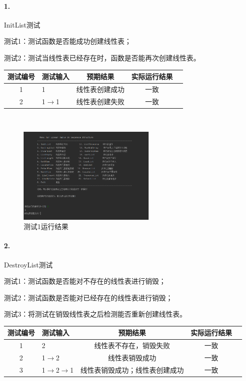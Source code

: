 \documentclass[supercite]{Experimental_Report}
\theoremstyle{definition}
\begin{document}
\paragraph{ 1.}InitList测试

测试1：测试函数是否能成功创建线性表；

测试2：测试当线性表已经存在时，函数是否能再次创建线性表。

\vspace{0.5em}

\begin{tabular}{|c|l|c|c|c|}
	\hline
	测试编号 & 测试输入 & 预期结果 & 实际运行结果 \\
	\hline
	1 & 1 & 线性表创建成功 & 一致 \\
	\hline
	2 & 1$\rightarrow$1 & 线性表创建失败 & 一致 \\
	\hline
\end{tabular}

~\

 \begin{figure}[H]
 	\centering
 	\includegraphics[width=0.6\textwidth]{images/线性表测试1.png}
 	\caption{测试1运行结果}
 	\label{txlab}
 \end{figure}


\paragraph{ 2.}DestroyList测试

测试1：测试函数是否能对不存在的线性表进行销毁；

测试2：测试函数是否能对已经存在的线性表进行销毁；

测试3：将测试在销毁线性表之后检测能否重新创建线性表。

\vspace{0.5em}

\begin{tabular}{|c|l|c|c|c|}
	\hline
	测试编号 & 测试输入 & 预期结果 & 实际运行结果 \\
	\hline
	1 & 2 & 线性表不存在，销毁失败 & 一致 \\
	\hline
	2 & 1$\rightarrow$2 & 线性表销毁成功 & 一致 \\
	\hline
	3 & 1$\rightarrow$2$\rightarrow$1 & 线性表销毁成功；线性表创建成功 & 一致 \\
	\hline
\end{tabular}
\end{document}
